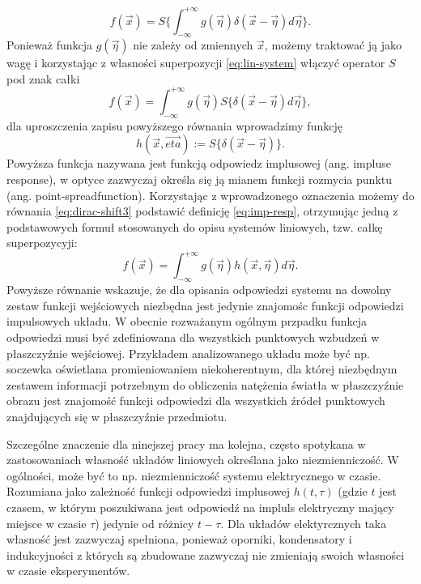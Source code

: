 \begin{equation}
f(\vec{x})=S \{\int_{-\infty}^{+\infty} g(\vec{\eta}) \delta(\vec{x}-\vec{\eta}) d \vec{\eta} \}.
\label{eq:dirac-shift2}
\end{equation}
Ponieważ funkcja $g(\vec{\eta})$ nie zależy od zmiennych $\vec{x}$, możemy traktować ją jako wagę i korzystając z własności superpozycji \ref{eq:lin-system} włączyć operator $S{}$ pod znak całki
\begin{equation}
f(\vec{x})=\int_{-\infty}^{+\infty} g(\vec{\eta})  S\{\delta(\vec{x}-\vec{\eta}) d \vec{\eta} \},
\label{eq:dirac-shift3}
\end{equation}
dla uproszczenia zapisu powyższego równania wprowadzimy funkcję
\begin{equation}
h(\vec{x},\vec{eta}):=S\{\delta(\vec{x}-\vec{\eta})\}.
\label{eq:imp-resp}
\end{equation}
Powyższa funkcja nazywana jest funkcją odpowiedz implusowej (ang. impluse response), w optyce zazwyczaj określa się ją mianem funkcji rozmycia punktu (ang. point-spreadfunction). Korzystając z wprowadzonego oznaczenia możemy do równania \ref{eq:dirac-shift3}  podstawić definicję \ref{eq:imp-resp}, otrzymując jedną z podstawowych formuł stosowanych do opisu systemów liniowych, tzw. całkę superpozycyji:
\begin{equation}
f(\vec{x})=\int_{-\infty}^{+\infty} g(\vec{\eta})  h(\vec{x},\vec{\eta}) d \vec{\eta} .
\label{eq:sup-int}
\end{equation}
Powyższe równanie wskazuje, że dla opisania odpowiedzi systemu na dowolny zestaw funkcji wejściowych niezbędna jest jedynie znajomośc funkcji odpowiedzi impulsowych układu. W obecnie rozważanym ogólnym przpadku funkcja odpowiedzi musi być zdefiniowana dla wszystkich punktowych wzbudzeń w płaszczyźnie wejściowej. Przykładem analizowanego układu może być np. soczewka oświetlana promieniowaniem niekoherentnym, dla której niezbędnym zestawem informacji potrzebnym do obliczenia natężenia światła w płaszczyźnie obrazu jest znajomość funkcji odpowiedzi dla wszystkich źródeł punktowych znajdujących się w płaszczyźnie przedmiotu. 

Szczególne znaczenie dla ninejszej pracy ma kolejna, często spotykana w zastosowaniach własność układów liniowych określana jako niezmienniczość. W ogólności, może być to np. niezmienniczość systemu elektrycznego w czasie. Rozumiana jako zależność funkcji odpowiedzi implusowej $h(t,\tau)$ (gdzie $t$ jest czasem, w którym poszukiwana jest odpowiedź na impluls elektryczny mający miejsce w czasie $\tau$) jedynie od różnicy $t-\tau$. Dla układów elektyrcznych taka własność jest zazwyczaj spełniona, ponieważ oporniki, kondensatory i indukcyjności z których są zbudowane zazwyczaj nie zmieniają swoich własności w czasie eksperymentów.

